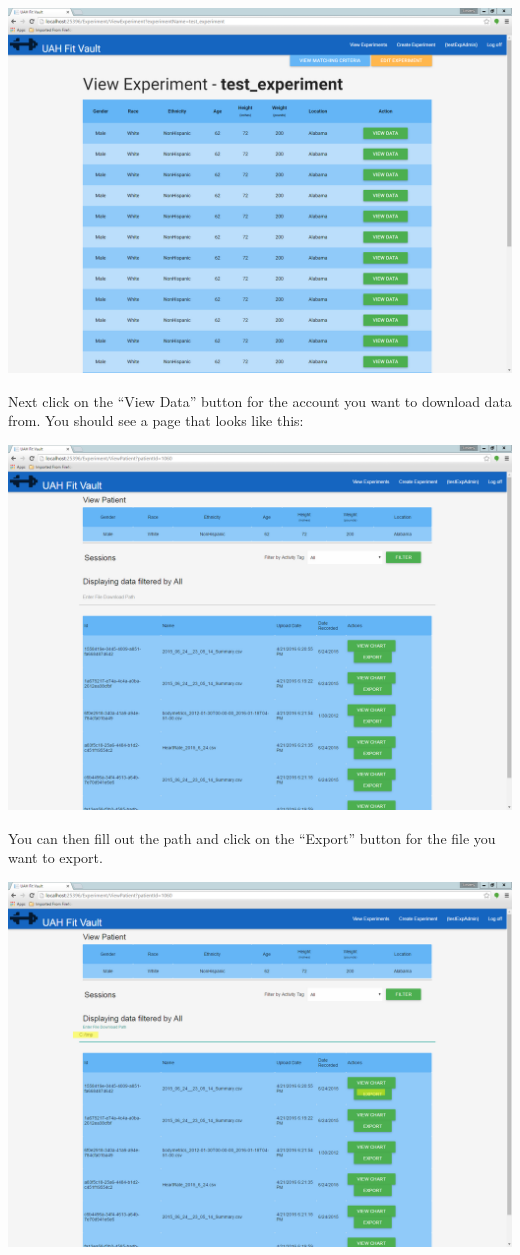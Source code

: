 \documentclass[letterpaper,10pt,english]{sphinxmanual}
\begin{document}
\includegraphics{view_experiments_expadmin_export.png}

Next click on the ``View Data'' button for the account you want to download data from. You should see a page that looks
like this:

\includegraphics{view_experiments_expadmin_export_2.png}

You can then fill out the path and click on the ``Export'' button for the file you want to export.

\includegraphics{view_experiments_expadmin_export_3.png}
\end{document}
